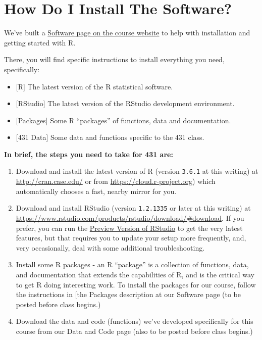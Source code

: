 \documentclass[
]{book}
\providecommand{\tightlist}{%
  \setlength{\itemsep}{0pt}\setlength{\parskip}{0pt}}
\begin{document}
\hypertarget{how-do-i-install-the-software}{%
\section{How Do I Install The Software?}\label{how-do-i-install-the-software}}

We've built a \href{https://github.com/THOMASELOVE/2019-431/tree/master/SOFTWARE}{Software page on the course website} to help with installation and getting started with R.

There, you will find specific instructions to install everything you need, specifically:

\begin{itemize}
\tightlist
\item
  {[}R{]} The latest version of the R statistical software.
\item
  {[}RStudio{]} The latest version of the RStudio development environment.
\item
  {[}Packages{]} Some R ``packages'' of functions, data and documentation.
\item
  {[}431 Data{]} Some data and functions specific to the 431 class.
\end{itemize}

\textbf{In brief, the steps you need to take for 431 are:}

\begin{enumerate}
\def\labelenumi{\arabic{enumi}.}
\tightlist
\item
  Download and install the latest version of R (version \texttt{3.6.1} at this writing) at \url{http://cran.case.edu/} or from \url{https://cloud.r-project.org}) which automatically chooses a fast, nearby mirror for you.
\item
  Download and install RStudio (version \texttt{1.2.1335} or later at this writing) at \url{https://www.rstudio.com/products/rstudio/download/\#download}. If you prefer, you can run the \href{https://www.rstudio.com/products/rstudio/download/preview/}{Preview Version of RStudio} to get the very latest features, but that requires you to update your setup more frequently, and, very occasionally, deal with some additional troubleshooting.
\item
  Install some R packages - an R ``package'' is a collection of functions, data, and documentation that extends the capabilities of R, and is the critical way to get R doing interesting work. To install the packages for our course, follow the instructions in {[}the Packages description at our Software page (to be posted before class begins.)
\item
  Download the data and code (functions) we've developed specifically for this course from our Data and Code page (also to be posted before class begins.)
\end{enumerate}
\end{document}
